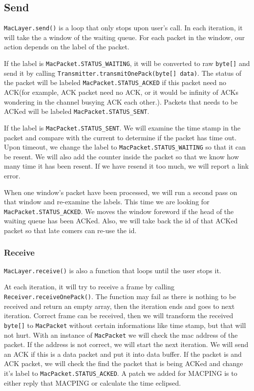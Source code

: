 \documentclass[conference,compsoc]{IEEEtran}
\begin{document}
	\subsection{Send}
		\lstinline{MacLayer.send()} is a loop that only stops upon user's call.
		In each iteration, it will take the a window of the waiting queue. For each packet in the window, our action depends on the label of the packet.
		\par
		If the label is \lstinline{MacPacket.STATUS_WAITING}, it will be converted to raw \lstinline{byte[]} and send it by calling \lstinline{Transmitter.transmitOnePack(byte[] data)}. The status of the packet will be labeled \lstinline{MacPacket.STATUS_ACKED} if this packet need no ACK(for example, ACK packet need no ACK, or it would be infinity of ACKs wondering in the channel busying ACK each other.). Packets that needs to be ACKed will be labeled \lstinline{MacPacket.STATUS_SENT}.
		\par 
		If the label is \lstinline{MacPacket.STATUS_SENT}. 
		We will examine the time stamp in the packet and compare with the current to determine if the packet has time out. Upon timeout, we change the label to \lstinline{MacPacket.STATUS_WAITING} so that it can be resent. 
		We will also add the counter inside the packet so that we know how many time it has been resent. 
		If we have resend it too much, we will report a link error.
		\par
		When one window's packet have been processed, we will run a second pass on that window and re-examine the labels. 
		This time we are looking for \lstinline{MacPacket.STATUS_ACKED}. 
		We moves the window foreword if the head of the waiting queue has been ACKed. 
		Also, we will take back the id of that ACKed packet so that late comers can re-use the id.

	\subsubsection{Receive}
		\lstinline{MacLayer.receive()} is also a function that loops until the user stops it.
		\par
		At each iteration, it will try to receive a frame by calling \lstinline{Receiver.receiveOnePack()}.
		The function may fail as there is nothing to be received and return an empty array, then the iteration ends and goes to next iteration.
		Correct frame can be received, then we will transform the received \lstinline{byte[]} to \lstinline{MacPacket} without certain informations like time stamp, but that will not hurt.
		With an instance of \lstinline{MacPacket} we will check the mac address of the packet. 
		If the address is not correct, we will start the next iteration. 
		We will send an ACK if this is a data packet and put it into data buffer. 
		If the packet is and ACK packet, we will check the find the packet that is being ACKed and change it's label to \lstinline{MacPacket.STATUS_ACKED}.
		A patch we added for MACPING is to either reply that MACPING or calculate the time eclipsed.
\end{document}
